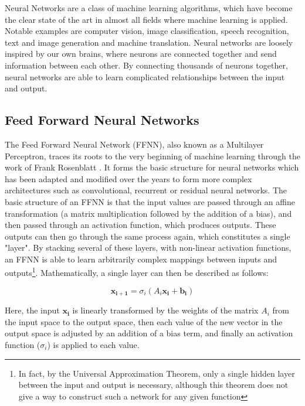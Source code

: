 \documentclass[UKenglish]{uiomasterthesis} %
\theoremstyle{definition}
\begin{document}
Neural Networks are a class of machine learning algorithms, which have become the clear state of the art in almost all fields where machine learning is applied. Notable examples are computer vision, image classification, speech recognition, text and image generation and machine translation. Neural networks are loosely inspired by our own brains, where neurons are connected together and send information between each other. By connecting thousands of neurons together, neural networks are able to learn complicated relationships between the input and output.

\subsection{Feed Forward Neural Networks}

The Feed Forward Neural Network (FFNN), also known as a Multilayer Perceptron, traces its roots to the very beginning of machine learning through the work of Frank Rosenblatt \cite{rosenblatt}. It forms the basic structure for neural networks which has been adapted and modified over the years to form more complex architectures such as convolutional, recurrent or residual neural networks. The basic structure of an FFNN is that the input values are passed through an affine transformation (a matrix multiplication followed by the addition of a bias), and then passed through an activation function, which produces outputs. These outputs can then go through the same process again, which constitutes a single "layer". By stacking several of these layers, with non-linear activation functions, an FFNN is able to learn arbitrarily complex mappings between inputs and outputs\footnote{In fact, by the Universal Approximation Theorem, only a single hidden layer between the input and output is necessary, although this theorem does not give a way to construct such a network for any given function}. Mathematically, a single layer can then be described as follows:

\begin{equation}
\bm{x_{i+1}} = \sigma_i (A_i \bm{x_i} + \bm{b_i})
\label{ffnn}
\end{equation}

Here, the input $\bm{x_i}$ is linearly transformed by the weights of the matrix $A_i$ from the input space to the output space, then each value of the new vector in the output space is adjusted by an addition of a bias term, and finally an activation function ($\sigma_i$) is applied to each value. 
\end{document}
